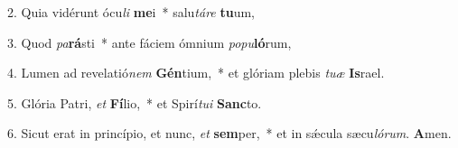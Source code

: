 \item 2. Quia vidérunt ócu\textit{li} \textbf{me}i~* salu\hspace{0.03em}\textit{táre} \textbf{tu}um,
\item 3. Quod \textit{pa}\textbf{rá}sti~* ante fáciem ómnium \textit{popu}\textbf{ló}rum,
\item 4. Lumen ad revelatió\textit{nem} \textbf{Gén}tium,~* et glóriam plebis \textit{tuæ} \textbf{Is}rael.
\item 5. Glória Patri, \textit{et} \textbf{Fí}lio,~* et Spirí\textit{tui} \textbf{Sanc}to.
\item 6. Sicut erat in princípio, et nunc, \textit{et} \textbf{sem}per,~* et in sǽcula sæcu\hspace{0.03em}\textit{lórum}. \textbf{A}men.
